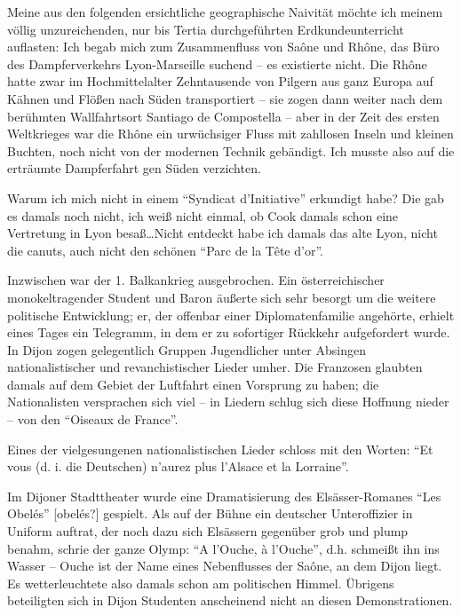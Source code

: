 Meine aus den folgenden ersichtliche geographische Naivität möchte ich meinem völlig unzureichenden, nur bis Tertia durchgeführten Erdkundeunterricht auflasten: Ich begab mich zum Zusammenfluss von Saône und Rhône, das Büro des Dampferverkehrs Lyon-Marseille suchend -- es existierte nicht. Die Rhône hatte zwar im Hochmittelalter Zehntausende von Pilgern aus ganz Europa auf Kähnen und Flößen nach Süden transportiert -- sie zogen dann weiter nach dem berühmten Wallfahrtsort Santiago de Compostella -- aber in der Zeit des ersten Weltkrieges war die Rhône ein urwüchsiger Fluss mit zahllosen Inseln und kleinen Buchten, noch nicht von der modernen Technik gebändigt. Ich musste also auf die erträumte Dampferfahrt gen Süden verzichten.

Warum ich mich nicht in einem \enquote{Syndicat d'Initiative} erkundigt habe? Die gab es damals noch nicht, ich weiß nicht einmal, ob Cook damals schon eine Vertretung in Lyon besaß\dots Nicht entdeckt habe ich damals das alte Lyon, nicht die canuts, auch nicht den schönen \enquote{Parc de la Tête d'or}.

Inzwischen war der 1. Balkankrieg ausgebrochen. Ein österreichischer monokeltragender Student und Baron äußerte sich sehr besorgt um die weitere politische Entwicklung; er, der offenbar einer Diplomatenfamilie angehörte, erhielt eines Tages ein Telegramm, in dem er zu sofortiger Rückkehr aufgefordert wurde. In Dijon zogen gelegentlich Gruppen Jugendlicher unter Absingen nationalistischer und revanchistischer Lieder umher. Die Franzosen glaubten damals auf dem Gebiet der Luftfahrt einen Vorsprung zu haben; die Nationalisten versprachen sich viel -- in Liedern schlug sich diese Hoffnung nieder -- von den \enquote{Oiseaux de France}.

Eines der vielgesungenen nationalistischen Lieder schloss mit den Worten: \enquote{Et vous (d. i. die Deutschen) n'aurez plus l'Alsace et la Lorraine}.

Im Dijoner Stadttheater wurde eine Dramatisierung des Elsässer-Romanes \enquote{Les Obelés} [obelés?] gespielt. Als auf der Bühne ein deutscher Unteroffizier in Uniform auftrat, der noch dazu sich Elsässern gegenüber grob und plump benahm, schrie der ganze Olymp: \enquote{A l'Ouche, à l'Ouche}, d.h. schmeißt ihn ins Wasser -- Ouche ist der Name eines Nebenflusses der Saône, an dem Dijon liegt. Es wetterleuchtete also damals schon am politischen Himmel. Übrigens beteiligten sich in Dijon Studenten anscheinend nicht an diesen Demonstrationen.

